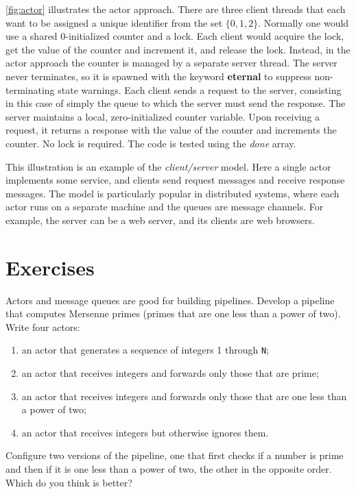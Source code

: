 \documentclass{report}
\begin{document}
\autoref{fig:actor} illustrates the actor approach.
There are three client threads that each want to be assigned
a unique identifier from the set $\{ 0, 1, 2 \}$.
Normally one would use a shared 0-initialized counter and a lock.
Each client would acquire the lock, get the value of the counter
and increment it, and release the lock.
Instead, in the actor approach the counter is managed by a
separate server thread.
The server never terminates, so it is spawned with the keyword
\textbf{eternal} to suppress non-terminating state warnings.
Each client sends a request to the server, consisting in this case
of simply the queue to which the server must send the response.
The server maintains a local, zero-initialized counter variable.
Upon receiving a request, it returns a response with the value of
the counter and increments the counter.  No lock is required.
The code is tested using the \textit{done} array.

This illustration is an example of the \emph{client/server} model.
Here a single actor implements some service, and clients send request
messages and receive response messages.  The model is particularly
popular in distributed systems, where each actor runs on a separate
machine and the queues are message channels.  For example, the server
can be a web server, and its clients are web browsers.

\section*{Exercises}
\begin{problems}
\item Actors and message queues are good for building pipelines.
Develop a pipeline that computes Mersenne primes (primes that are one less
than a power of two).  Write four actors:
\begin{enumerate}
\item an actor that generates a sequence of integers 1 through \texttt{N};
\item an actor that receives integers and forwards only those that are prime;
\item an actor that receives integers and forwards only those that are one
less than a power of two;
\item an actor that receives integers but otherwise ignores them.
\end{enumerate}
Configure two versions of the pipeline, one that first checks if a number
is prime and then if it is one less than a power of two, the other
in the opposite order.  Which do you think is better?
\end{problems}
\end{document}
